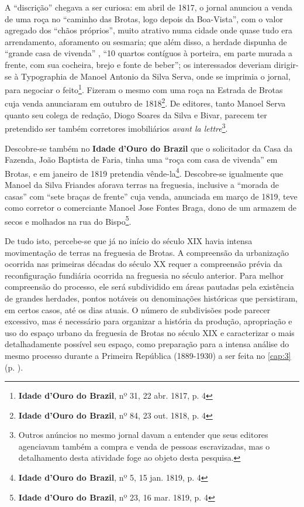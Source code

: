 A ``discrição'' chegava a ser curiosa: em abril de 1817, o jornal anunciou a venda de uma roça no ``caminho das Brotas, logo depois da Boa-Vista'', com o valor agregado dos ``chãos próprios'', muito atrativo numa cidade onde quase tudo era arrendamento, aforamento ou sesmaria; que além disso, a herdade dispunha de ``grande casa de vivenda'' , ``10 quartos contíguos à porteira, em parte murada a frente, com sua cocheira, brejo e fonte de beber''; os interessados deveriam dirigir-se à Typographia de Manoel Antonio da Silva Serva, onde se imprimia o jornal, para negociar o feito\footnote{\textbf{Idade d'Ouro do Brazil}, nº 31, 22 abr. 1817, p. 4}. Fizeram o mesmo com uma roça na Estrada de Brotas cuja venda anunciaram em outubro de 1818\footnote{\textbf{Idade d'Ouro do Brazil}, nº 84, 23 out. 1818, p. 4}. De editores, tanto Manoel Serva quanto seu colega de redação, Diogo Soares da Silva e Bivar, parecem ter pretendido ser também corretores imobiliários \textit{avant la lettre}\footnote{Outros anúncios no mesmo jornal davam a entender que seus editores agenciavam também a compra e venda de pessoas escravizadas, mas o detalhamento desta atividade foge ao objeto desta pesquisa.}.

Descobre-se também no \textbf{Idade d'Ouro do Brazil} que o solicitador da Casa da Fazenda, João Baptista de Faria, tinha uma ``roça com casa de vivenda'' em Brotas, e em janeiro de 1819 pretendia vênde-la\footnote{\textbf{Idade d'Ouro do Brazil}, nº 5, 15 jan. 1819, p. 4}. Descobre-se igualmente que Manoel da Silva Friandes aforava terras na freguesia, inclusive a ``morada de casas'' com ``sete braças de frente'' cuja venda, anunciada em março de 1819, teve como corretor o comerciante Manoel Jose Fontes Braga, dono de um armazem de secos e molhados na rua do Bispo\footnote{\textbf{Idade d'Ouro do Brazil}, nº 23, 16 mar. 1819, p. 4}.

De tudo isto, percebe-se que já no início do século XIX havia intensa movimentação de terras na freguesia de Brotas. A compreensão da urbanização ocorrida nas primeiras décadas do século XX requer a compreensão prévia da reconfiguração fundiária ocorrida na freguesia no século anterior. Para melhor compreensão do processo, ele será subdividido em áreas pautadas pela existência de grandes herdades, pontos notáveis ou denominações históricas que persistiram, em certos casos, até os dias atuais. O número de subdivisões pode parecer excessivo, mas é necessário para organizar a história da produção, apropriação e uso do espaço urbano da freguesia de Brotas no século XIX e caracterizar o mais detalhadamente possível seu espaço, como preparação para a intensa análise do mesmo processo durante a Primeira República (1889-1930) a ser feita no \autoref{cap:3} (p. \pageref{cap:3}).

